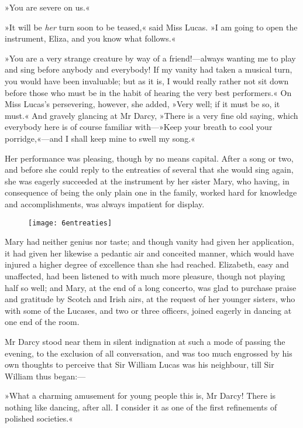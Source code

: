 »You are severe on us.«

»It will be \textit{her} turn soon to be teased,« said Miss Lucas. »I am going to open the instrument, Eliza, and you know what follows.«

»You are a very strange creature by way of a friend!—always wanting me to play and sing before anybody and everybody! If my vanity had taken a musical turn, you would have been invaluable; but as it is, I would really rather not sit down before those who must be in the habit of hearing the very best performers.« On Miss Lucas's persevering, however, she added, »Very well; if it must be so, it must.« And gravely glancing at Mr Darcy, »There is a very fine old saying, which everybody here is of course familiar with—»Keep your breath to cool your porridge,«—and I shall keep mine to swell my song.«

Her performance was pleasing, though by no means capital. After a song or two, and before she could reply to the entreaties of several that she would sing again, she was eagerly succeeded at the instrument by her sister Mary, who having, in consequence of being the only plain one in the family, worked hard for knowledge and accomplishments, was always impatient for display.

\begin{figure}[tbh]
\centering
\texttt{[image: 6entreaties]}
\end{figure}

Mary had neither genius nor taste; and though vanity had given her application, it had given her likewise a pedantic air and conceited manner, which would have injured a higher degree of excellence than she had reached. Elizabeth, easy and unaffected, had been listened to with much more pleasure, though not playing half so well; and Mary, at the end of a long concerto, was glad to purchase praise and gratitude by Scotch and Irish airs, at the request of her younger sisters, who with some of the Lucases, and two or three officers, joined eagerly in dancing at one end of the room.

Mr Darcy stood near them in silent indignation at such a mode of passing the evening, to the exclusion of all conversation, and was too much engrossed by his own thoughts to perceive that Sir William Lucas was his neighbour, till Sir William thus began:—

»What a charming amusement for young people this is, Mr Darcy! There is nothing like dancing, after all. I consider it as one of the first refinements of polished societies.«

